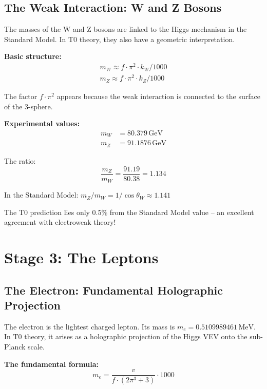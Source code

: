 	\subsection{The Weak Interaction: W and Z Bosons}
	
	The masses of the W and Z bosons are linked to the Higgs mechanism in the Standard Model. In T0 theory, they also have a geometric interpretation.
	
	\textbf{Basic structure:}
	\begin{align}
		\boxed{m_W \approx f \cdot \pi^2 \cdot k_W / 1000} \\
		\boxed{m_Z \approx f \cdot \pi^2 \cdot k_Z / 1000}
	\end{align}
	
	The factor \(f \cdot \pi^2\) appears because the weak interaction is connected to the surface of the 3-sphere.
	
	\textbf{Experimental values:}
	\begin{align}
		m_W &= 80.379\,\text{GeV} \\
		m_Z &= 91.1876\,\text{GeV}
	\end{align}
	
	The ratio:
	\begin{equation}
		\frac{m_Z}{m_W} = \frac{91.19}{80.38} = 1.134
	\end{equation}
	
	In the Standard Model: \(m_Z/m_W = 1/\cos\theta_W \approx 1.141\)
	
	The T0 prediction lies only 0.5\% from the Standard Model value -- an excellent agreement with electroweak theory!
	
	\section{Stage 3: The Leptons}
	
	\subsection{The Electron: Fundamental Holographic Projection}
	
	The electron is the lightest charged lepton. Its mass is \(m_e = 0.5109989461\,\text{MeV}\). In T0 theory, it arises as a holographic projection of the Higgs VEV onto the sub-Planck scale.
	
	\textbf{The fundamental formula:}
	\begin{equation}
		\boxed{m_e = \frac{v}{f \cdot (2\pi^3 + 3)} \cdot 1000}
	\end{equation}
	
